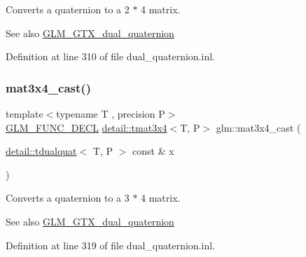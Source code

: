 Converts a quaternion to a 2 $\ast$ 4 matrix.

\begin{DoxySeeAlso}{See also}
\hyperlink{group__gtc__dual__quaternion}{G\+L\+M\+\_\+\+G\+T\+X\+\_\+dual\+\_\+quaternion} 
\end{DoxySeeAlso}


Definition at line 310 of file dual\+\_\+quaternion.\+inl.

\mbox{\label{group__gtc__dual__quaternion_ga2f4f0a1275fa95c272dd6ad6df75013d}} 
\subsubsection{\texorpdfstring{mat3x4\+\_\+cast()}{mat3x4\_cast()}}
{\footnotesize\ttfamily template$<$typename T , precision P$>$ \\
\hyperlink{setup_8hpp_ab2d052de21a70539923e9bcbf6e83a51}{G\+L\+M\+\_\+\+F\+U\+N\+C\+\_\+\+D\+E\+CL} \hyperlink{structglm_1_1detail_1_1tmat3x4}{detail\+::tmat3x4}$<$T, P$>$ glm\+::mat3x4\+\_\+cast (\begin{DoxyParamCaption}\item[{\hyperlink{structglm_1_1detail_1_1tdualquat}{detail\+::tdualquat}$<$ T, P $>$ const \&}]{x }\end{DoxyParamCaption})}

Converts a quaternion to a 3 $\ast$ 4 matrix.

\begin{DoxySeeAlso}{See also}
\hyperlink{group__gtc__dual__quaternion}{G\+L\+M\+\_\+\+G\+T\+X\+\_\+dual\+\_\+quaternion} 
\end{DoxySeeAlso}


Definition at line 319 of file dual\+\_\+quaternion.\+inl.

\mbox{\label{group__gtc__dual__quaternion_ga4364d115fe8ee2f65ff047726133d0ad}} 
